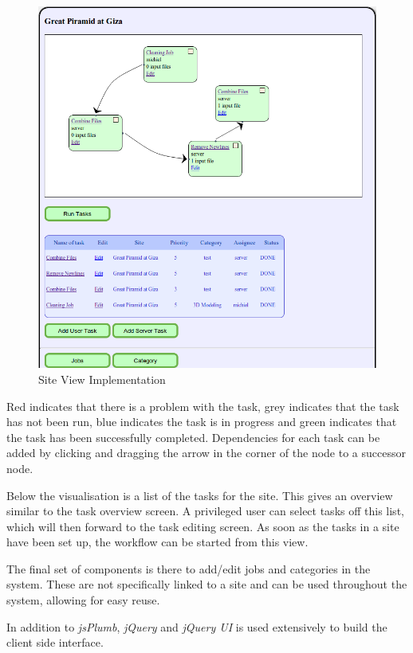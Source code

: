 \begin{description}
\begin{figure}[!h]
\begin{center}
            \includegraphics[scale=0.35]{figures/site_view_impl2.png}
        \end{center}
        \caption{Site View Implementation}
        \label{site_view_impl2}
    \end{figure}
    Red indicates that there is a problem with the task, grey indicates that the task has not
    been run, blue indicates the task is in progress and green indicates that
    the task has been successfully completed. Dependencies for each task can be
    added by clicking and dragging the arrow in the corner of the node to a
    successor node.

    Below the visualisation is a list of the tasks for the site. This gives an overview
    similar to the task overview screen. A privileged user can select tasks off
    this list, which will then forward to the task editing screen.
    As soon as the tasks in a site have been set up, the workflow can be started from this view.

    The final set of components is there to add/edit jobs and categories in the system. These
    are not specifically linked to a site and can be used throughout the  system, allowing
    for easy reuse.

\end{description}
In addition to \emph{jsPlumb}, \emph{jQuery} and \emph{jQuery UI} is used extensively to build
the client side interface.

